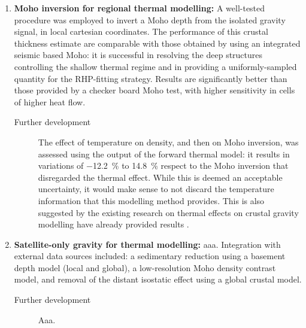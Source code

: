 \begin{enumerate}
    \item \textsf{\textbf{Moho inversion for regional thermal modelling:}}
    A well-tested procedure was employed to invert a Moho depth from the isolated gravity signal, in local cartesian coordinates.
    The performance of this crustal thickness estimate are comparable with those obtained by using an integrated seismic based Moho: it is successful in resolving the deep structures controlling the shallow thermal regime and in providing a uniformly-sampled quantity for the RHP-fitting strategy.
    Results are significantly better than those provided by a checker board Moho test, with higher sensitivity in cells of higher heat flow.
    \begin{description}
        \item[\quad Further development] The effect of temperature on density, and then on Moho inversion, was assessed using the output of the forward thermal model: it results in variations of \SI{-12.2}{\percent} to \SI[retain-explicit-plus]{+14.8}{\percent} respect to the Moho inversion that disregarded the thermal effect. While this is deemed an acceptable uncertainty, it would make sense to not discard the temperature information that this modelling method provides. This is also suggested by the existing research on thermal effects on crustal gravity modelling have already provided  results \parencite[e.g.][]{Bagherbandi2017thermal}.
    \end{description}

    \item \textsf{\textbf{Satellite-only gravity for thermal modelling:}}
    aaa.
    Integration with external data sources included: a sedimentary reduction using a basement depth model (local and global), a low-resolution Moho density contrast model, and removal of the distant isostatic effect using a global crustal model.
    \begin{description}
        \item[\quad Further development] Aaa.
    \end{description}
\end{enumerate}

